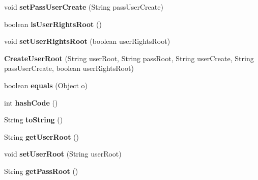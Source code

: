\begin{DoxyCompactItemize}
\mbox{\label{class_create_user_root_a1fa56655ebc5cfce86df78429d22a22b}} 
void {\bfseries set\+Pass\+User\+Create} (String pass\+User\+Create)
\item 
\mbox{\label{class_create_user_root_a46105498a89702d50c7ee93b000878cc}} 
boolean {\bfseries is\+User\+Rights\+Root} ()
\item 
\mbox{\label{class_create_user_root_a20fbe3d3cda3ea5bcbc238e4baab039d}} 
void {\bfseries set\+User\+Rights\+Root} (boolean user\+Rights\+Root)
\item 
\mbox{\label{class_create_user_root_a089337f6faedcd6f4850ac9bf60c7d85}} 
{\bfseries Create\+User\+Root} (String user\+Root, String pass\+Root, String user\+Create, String pass\+User\+Create, boolean user\+Rights\+Root)
\item 
\mbox{\label{class_create_user_root_ad00b10c9a8ea120dbef823e1cbf2961d}} 
boolean {\bfseries equals} (Object o)
\item 
\mbox{\label{class_create_user_root_a20b56a7302f659762a408ee77f94ce7f}} 
int {\bfseries hash\+Code} ()
\item 
\mbox{\label{class_create_user_root_a162c5272b7e633c81aca4077088eeccb}} 
String {\bfseries to\+String} ()
\item 
\mbox{\label{class_create_user_root_ad3a6203b1afee594d5e0214b721bbabd}} 
String {\bfseries get\+User\+Root} ()
\item 
\mbox{\label{class_create_user_root_a1ef78fab3a8f64515e47e133a5e40a00}} 
void {\bfseries set\+User\+Root} (String user\+Root)
\item 
\mbox{\label{class_create_user_root_a2e2dd9b254a65fad94d21b811a3dbd55}} 
String {\bfseries get\+Pass\+Root} ()
\item 
\mbox{\label{class_create_user_root_a1ec9f4160b07eb21578fc405a5e9fca2}} 

\end{DoxyCompactItemize}
